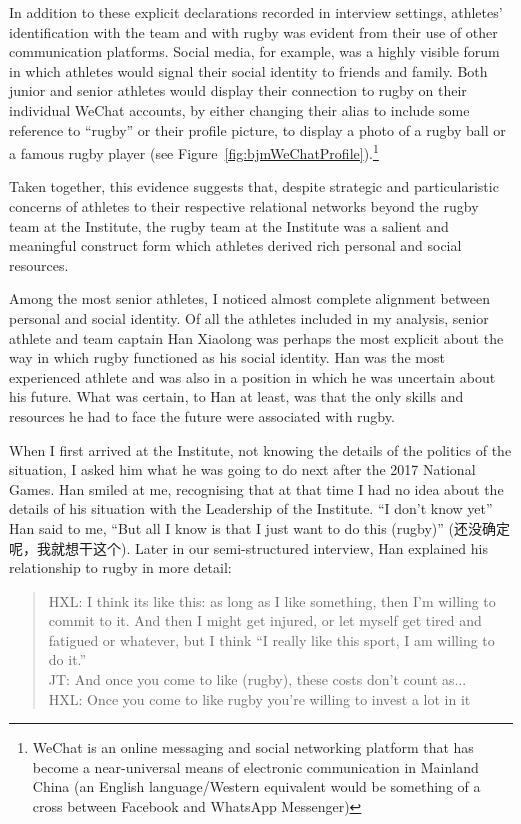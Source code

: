 \begin{CJK}{UTF8}{gbsn}
In addition to these explicit declarations recorded in interview settings, athletes' identification with the team and with rugby was evident from their use of other communication platforms.  Social media, for example, was a highly visible forum in which athletes would signal their social identity to friends and family.  Both junior and senior athletes would display their connection to rugby on their individual WeChat accounts, by either changing their alias to include some reference to ``rugby'' or their profile picture, to display a photo of a rugby ball or a famous rugby player (see Figure~\ref{fig:bjmWeChatProfile}).\footnote{WeChat is an online messaging and social networking platform that has become a near-universal means of electronic communication in Mainland China (an English language/Western equivalent would be something of a cross between Facebook and WhatsApp Messenger)}




Taken together, this evidence suggests that, despite strategic and particularistic concerns of athletes to their respective relational networks beyond the rugby team at the Institute, the rugby team at the Institute was a salient and meaningful construct form which athletes derived rich personal and social resources.

Among the most senior athletes, I noticed almost complete alignment between personal and social identity.  Of all the athletes included in my analysis, senior athlete and team captain Han Xiaolong was perhaps the most explicit about the way in which rugby functioned as his social identity.  Han was the most experienced athlete and was also in a position in which he was uncertain about his future. What was certain, to Han at least, was that the only skills and resources he had to face the future were associated with rugby.

When I first arrived at the Institute, not knowing the details of the politics of the situation, I asked him what he was going to do next after the 2017 National Games.  Han smiled at me, recognising that at that time I had no idea about the details of his situation with the Leadership of the Institute. ``I don't know yet'' Han said to me, ``But all I know is that I just want to do this (rugby)'' (还没确定呢，我就想干这个).  Later in our semi-structured interview, Han explained his relationship to rugby in more detail:
          \begin{quote}
            HXL: I think its like this: as long as I like something, then I'm willing to commit to it.  And then I might get injured, or let myself get tired and fatigued or whatever, but I think ``I really like this sport, I am willing to do it.''\\
            JT: And once you come to like (rugby), these costs don't count as...\\
            HXL: Once you come to like rugby you're willing to invest a lot in it
          \end{quote}


\end{CJK}
